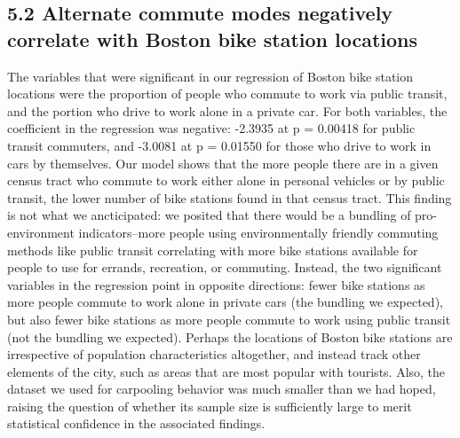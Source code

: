 \documentclass[
  12pt,
]{article}
\begin{document}
\hypertarget{alternate-commute-modes-negatively-correlate-with-boston-bike-station-locations}{%
\subsection{5.2 Alternate commute modes negatively correlate with Boston
bike station
locations}\label{alternate-commute-modes-negatively-correlate-with-boston-bike-station-locations}}

The variables that were significant in our regression of Boston bike
station locations were the proportion of people who commute to work via
public transit, and the portion who drive to work alone in a private
car. For both variables, the coefficient in the regression was negative:
-2.3935 at p = 0.00418 for public transit commuters, and -3.0081 at p =
0.01550 for those who drive to work in cars by themselves. Our model
shows that the more people there are in a given census tract who commute
to work either alone in personal vehicles or by public transit, the
lower number of bike stations found in that census tract. This finding
is not what we ancticipated: we posited that there would be a bundling
of pro-environment indicators--more people using environmentally
friendly commuting methods like public transit correlating with more
bike stations available for people to use for errands, recreation, or
commuting. Instead, the two significant variables in the regression
point in opposite directions: fewer bike stations as more people commute
to work alone in private cars (the bundling we expected), but also fewer
bike stations as more people commute to work using public transit (not
the bundling we expected). Perhaps the locations of Boston bike stations
are irrespective of population characteristics altogether, and instead
track other elements of the city, such as areas that are most popular
with tourists. Also, the dataset we used for carpooling behavior was
much smaller than we had hoped, raising the question of whether its
sample size is sufficiently large to merit statistical confidence in the
associated findings.
\end{document}
